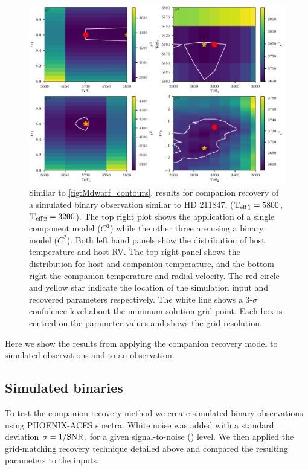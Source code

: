 \begin{figure}
    \centering
    \includegraphics[width=0.7\linewidth]{figures/companion_recovery/HD211847_example_pcolors}
    \caption[\textchisquared{} contour for companion recovery of a simulated observation of {HD 211847}.]{Similar to \cref{fig:Mdwarf_contours}, \textchisquared{} results for companion recovery of a simulated binary observation similar to {HD 211847}, (\({\textrm{T}_{\mathrm{eff}}}_{1} = 5800\)\K{}, \({\textrm{T}_{\mathrm{eff}}}_{2}=3200\)\K{}).
    The top right plot shows the application of a single component model (\(C^1\)) while the other three are using a binary model (\(C^2\)).
    Both left hand panels show the distribution of host temperature and host {RV}.
    The top right panel shows the distribution for host and companion temperature, and the bottom right the companion temperature and radial velocity.
    The red circle and yellow star indicate the location of the simulation input and recovered parameters respectively.
    The white line shows a 3-\(\sigma\) confidence level about the minimum \textchisquared{} solution grid point.
    Each box is centred on the parameter values and shows the grid resolution.}
    \label{fig:HD211847_simulated_contours}
\end{figure}
Here we show the results from applying the companion recovery model to simulated observations and to an observation.


\subsection{Simulated binaries}
\label{subsec:simulated_binaries}
To test the companion recovery method we create simulated binary observations using {PHOENIX-ACES} spectra.
White noise was added with a standard deviation \(\rm \sigma = 1/{\textrm{SNR}{}}\), for a given signal-to-noise (\snr{}) level.
We then applied the grid-matching recovery technique detailed above and compared the resulting parameters to the inputs.

